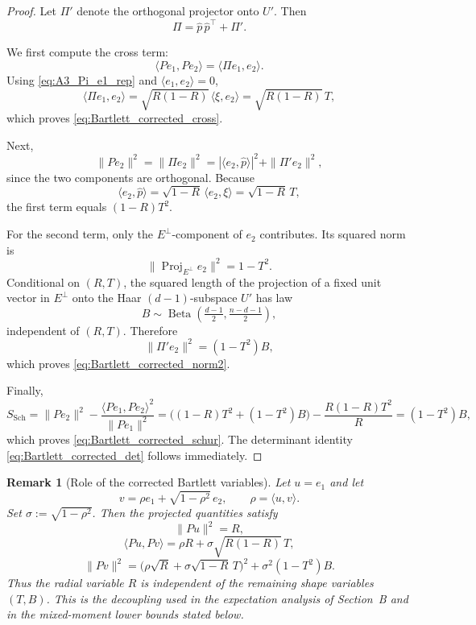 \documentclass{article}
\DeclareMathOperator{\BetaDist}{Beta}
\newtheorem{remark}{Remark}
\begin{document}
\begin{proof}
Let $\Pi'$ denote the orthogonal projector onto $U'$.
Then
\[
\Pi=\widehat p\,\widehat p^\top+\Pi'.
\]

We first compute the cross term:
\[
\langle Pe_1,Pe_2\rangle
=
\langle \Pi e_1,e_2\rangle.
\]
Using \eqref{eq:A3_Pi_e1_rep} and $\langle e_1,e_2\rangle=0$,
\[
\langle \Pi e_1,e_2\rangle
=
\sqrt{R(1-R)}\,\langle \xi,e_2\rangle
=
\sqrt{R(1-R)}\,T,
\]
which proves \eqref{eq:Bartlett_corrected_cross}.

Next,
\[
\|Pe_2\|^2=\|\Pi e_2\|^2
=
|\langle e_2,\widehat p\rangle|^2+\|\Pi' e_2\|^2,
\]
since the two components are orthogonal.
Because
\[
\langle e_2,\widehat p\rangle
=
\sqrt{1-R}\,\langle e_2,\xi\rangle
=
\sqrt{1-R}\,T,
\]
the first term equals $(1-R)T^2$.

For the second term, only the $E^\perp$-component of $e_2$ contributes.
Its squared norm is
\[
\|\operatorname{Proj}_{E^\perp} e_2\|^2 = 1-T^2.
\]
Conditional on $(R,T)$, the squared length of the projection of a fixed unit vector in $E^\perp$ onto the Haar $(d-1)$-subspace $U'$ has law
\[
B\sim \BetaDist\!\left(\tfrac{d-1}2,\tfrac{n-d-1}2\right),
\]
independent of $(R,T)$.
Therefore
\[
\|\Pi' e_2\|^2=(1-T^2)B,
\]
which proves \eqref{eq:Bartlett_corrected_norm2}.

Finally,
\[
S_{\mathrm{Sch}}
=
\|Pe_2\|^2-\frac{\langle Pe_1,Pe_2\rangle^2}{\|Pe_1\|^2}
=
\bigl((1-R)T^2+(1-T^2)B\bigr)-\frac{R(1-R)T^2}{R}
=
(1-T^2)B,
\]
which proves \eqref{eq:Bartlett_corrected_schur}. The determinant identity \eqref{eq:Bartlett_corrected_det} follows immediately.
\end{proof}

\begin{remark}[Role of the corrected Bartlett variables]
\label{rem:Bartlett_role}
Let $u=e_1$ and let
\[
v=\rho e_1+\sqrt{1-\rho^2}\,e_2,
\qquad
\rho=\langle u,v\rangle.
\]
Set $\sigma:=\sqrt{1-\rho^2}$.
Then the projected quantities satisfy
\begin{equation}
\|Pu\|^2 = R,
\label{eq:Bartlett_role_Pu}
\end{equation}
\begin{equation}
\langle Pu,Pv\rangle
=
\rho R+\sigma\sqrt{R(1-R)}\,T,
\label{eq:Bartlett_role_inner}
\end{equation}
\begin{equation}
\|Pv\|^2
=
\bigl(\rho\sqrt R+\sigma\sqrt{1-R}\,T\bigr)^2+\sigma^2(1-T^2)B.
\label{eq:Bartlett_role_Pv}
\end{equation}
Thus the radial variable $R$ is independent of the remaining shape variables $(T,B)$.
This is the decoupling used in the expectation analysis of Section~B and in the mixed-moment lower bounds stated below.
\end{remark}
\end{document}
